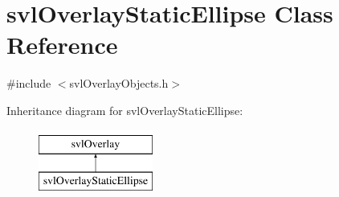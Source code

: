 \hypertarget{classsvl_overlay_static_ellipse}{}\section{svl\+Overlay\+Static\+Ellipse Class Reference}
\label{classsvl_overlay_static_ellipse}


{\ttfamily \#include $<$svl\+Overlay\+Objects.\+h$>$}

Inheritance diagram for svl\+Overlay\+Static\+Ellipse\+:\begin{figure}[H]
\begin{center}
\leavevmode
\includegraphics[height=2.000000cm]{d6/db0/classsvl_overlay_static_ellipse}
\end{center}
\end{figure}
